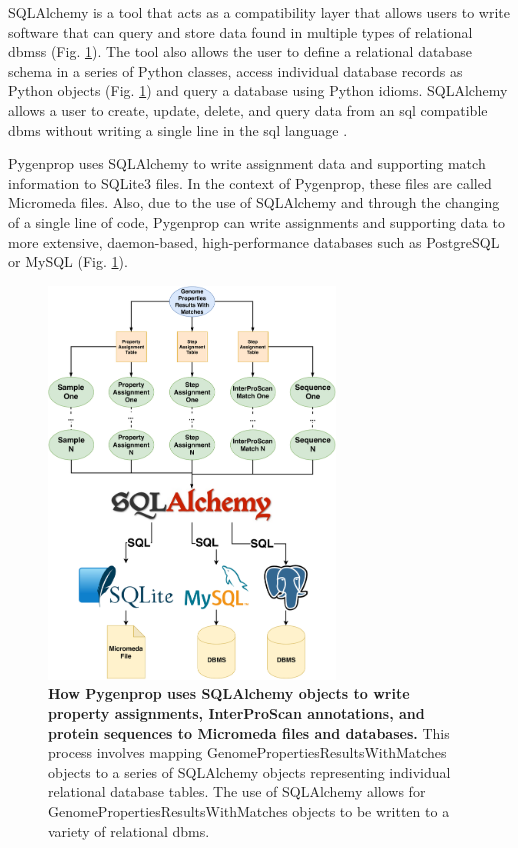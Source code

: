 SQLAlchemy \cite{bayer2014sqlalchemy} is a tool that acts as a compatibility 
layer that allows users to write software that can query and store data found in 
multiple types of relational \gls{dbms}s (Fig. \ref{fig:sqlalchemy}). The tool 
also allows the user to define a relational database schema in a series of 
Python classes, access individual database records as Python objects (Fig. 
\ref{fig:sqlalchemy}) and query a database using Python idioms. SQLAlchemy 
allows a user to create, update, delete, and query data from an \gls{sql} 
compatible \gls{dbms} without writing a single line in the \gls{sql} language 
\cite{bayer2014sqlalchemy}.

Pygenprop uses SQLAlchemy to write assignment data and supporting match 
information to SQLite3 files. In the context of Pygenprop, these files are 
called Micromeda files. Also, due to the use of SQLAlchemy and through the 
changing of a single line of code, Pygenprop can write assignments and 
supporting data to more extensive, daemon-based, high-performance databases such 
as PostgreSQL or MySQL (Fig. \ref{fig:sqlalchemy}).

\begin{figure}[!ht]
  \centering
	\includegraphics[width=0.68\textwidth]{media/SQLAlchemy.pdf}
	 \caption[How Pygenprop uses SQLAlchemy objects to write property assignments, 
InterProScan annotations, and protein sequences to Micromeda files and 
databases.]{\textbf{How Pygenprop uses SQLAlchemy objects to write property 
assignments, InterProScan annotations, and protein sequences to Micromeda files 
and databases.} This process involves mapping GenomePropertiesResultsWithMatches 
objects to a series of SQLAlchemy objects representing individual relational 
database tables. The use of SQLAlchemy allows for 
GenomePropertiesResultsWithMatches objects to be written to a variety of 
relational \gls{dbms}.} 
	 \label{fig:sqlalchemy}
\end{figure}


